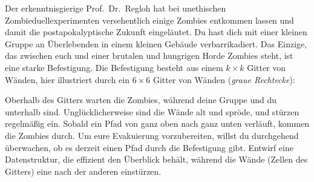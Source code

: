 \documentclass{uebung_cs}
\begin{document}
\begin{aufgabe}
	Der erkenntnisgierige Prof.~Dr.~Regloh hat bei unethischen Zombieduellexperimenten versehentlich einige Zombies entkommen lassen und damit die postapokalyptische Zukunft eingeläutet.
	Du hast dich mit einer kleinen Gruppe an Überlebenden in einem kleinen Gebäude verbarrikadiert.
	Das Einzige, das zwischen euch und einer brutalen und hungrigen Horde Zombies steht, ist eine starke Befestigung. Die Befestigung besteht aus einem $k\times k$ Gitter von Wänden, hier illustriert durch ein $6\times 6$ Gitter von Wänden (\emph{graue Rechtecke}):

	\begin{center}
		\newcommand{\wallAt}[2]{
			\draw[fill=black!25,draw=none] (#1-0.45,#2*0.7+0.3) rectangle (#1+0.45,#2*0.7-0.3);
		}
		\hspace{0.7cm}
	\end{center}
	Oberhalb des Gitters warten die Zombies, während deine Gruppe und du unterhalb sind.
	Unglücklicherweise sind die Wände alt und spröde, und stürzen regelmäßig ein.
	Sobald ein Pfad von ganz oben nach ganz unten verläuft, kommen die Zombies durch.
	Um eure Evakuierung vorzubereiten, willst du durchgehend überwachen, ob es derzeit einen Pfad durch die Befestigung gibt.
	Entwirf eine Datenstruktur, die effizient den Überblick behält, während die Wände (Zellen des Gitters) eine nach der anderen einstürzen.
\end{aufgabe}
\end{document}

